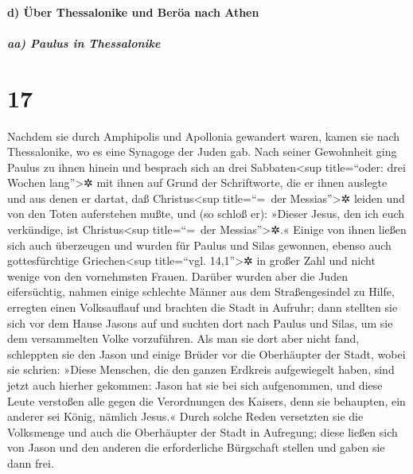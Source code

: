 \hypertarget{d-uxfcber-thessalonike-und-beruxf6a-nach-athen}{%
\paragraph{d) Über Thessalonike und Beröa nach
Athen}\label{d-uxfcber-thessalonike-und-beruxf6a-nach-athen}}

\hypertarget{aa-paulus-in-thessalonike}{%
\subparagraph{aa) Paulus in
Thessalonike}\label{aa-paulus-in-thessalonike}}

\hypertarget{section-16}{%
\section{17}\label{section-16}}

 Nachdem sie durch Amphipolis und Apollonia gewandert
waren, kamen sie nach Thessalonike, wo es eine Synagoge der Juden gab.
 Nach seiner Gewohnheit ging Paulus zu ihnen hinein und
besprach sich an drei Sabbaten\textless sup title=``oder: drei Wochen
lang''\textgreater✲ mit ihnen auf Grund der Schriftworte, 
die er ihnen auslegte und aus denen er dartat, daß Christus\textless sup
title=``=~der Messias''\textgreater✲ leiden und von den Toten
auferstehen mußte, und (so schloß er): »Dieser Jesus, den ich euch
verkündige, ist Christus\textless sup title=``=~der
Messias''\textgreater✲.«  Einige von ihnen ließen sich
auch überzeugen und wurden für Paulus und Silas gewonnen, ebenso auch
gottesfürchtige Griechen\textless sup title=``vgl. 14,1''\textgreater✲
in großer Zahl und nicht wenige von den vornehmsten Frauen.
 Darüber wurden aber die Juden eifersüchtig, nahmen einige
schlechte Männer aus dem Straßengesindel zu Hilfe, erregten einen
Volksauflauf und brachten die Stadt in Aufruhr; dann stellten sie sich
vor dem Hause Jasons auf und suchten dort nach Paulus und Silas, um sie
dem versammelten Volke vorzuführen.  Als man sie dort aber
nicht fand, schleppten sie den Jason und einige Brüder vor die
Oberhäupter der Stadt, wobei sie schrien: »Diese Menschen, die den
ganzen Erdkreis aufgewiegelt haben, sind jetzt auch hierher gekommen:
 Jason hat sie bei sich aufgenommen, und diese Leute
verstoßen alle gegen die Verordnungen des Kaisers, denn sie behaupten,
ein anderer sei König, nämlich Jesus.«  Durch solche Reden
versetzten sie die Volksmenge und auch die Oberhäupter der Stadt in
Aufregung;  diese ließen sich von Jason und den anderen
die erforderliche Bürgschaft stellen und gaben sie dann frei.

